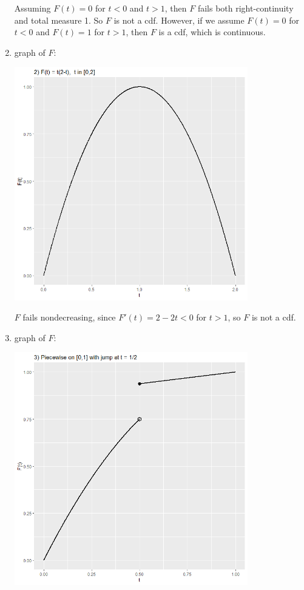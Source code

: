 \documentclass[12pt]{article}
\newenvironment{problem}[2][Problem]{\begin{trivlist}
\item[\hskip \labelsep {\bfseries #1}\hskip \labelsep {\bfseries #2.}]}
{\end{trivlist}}
\begin{document}
\begin{problem}{3}
\begin{enumerate}
\begin{center}
    \end{center}
    Assuming $F(t) = 0$ for $t < 0$ and $t > 1$, 
    then $F$ fails both right-continuity and total measure 1.
    So $F$ is not a cdf. However, if we assume $F(t) = 0$ for $t < 0$
    and $F(t) = 1$ for $t > 1$, then $F$ is a cdf, which is continuous.
    \pagebreak
    \item graph of $F$:
    \begin{center}
      \includegraphics[width=0.8\textwidth]{3b.png}
    \end{center}
    $F$ fails nondecreasing, since $F'(t) = 2-2t < 0$ for $t > 1$,
    so $F$ is not a cdf.
    \pagebreak
    \item graph of $F$:
    \begin{center}
      \includegraphics[width=0.8\textwidth]{3c.png}

\end{center}
\end{enumerate}
\end{problem}
\end{document}
